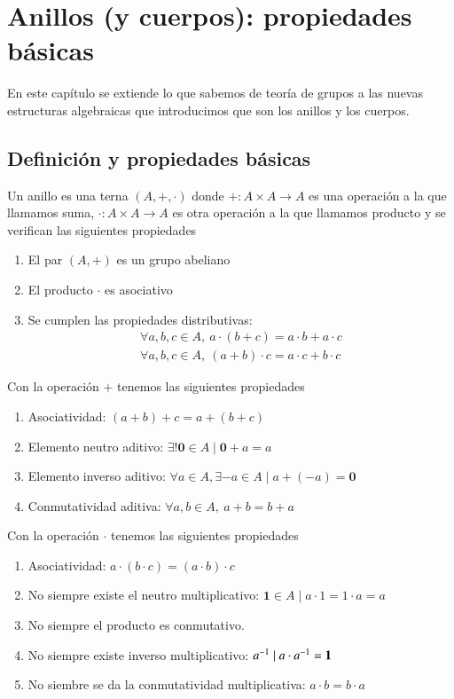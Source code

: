 
\chapter{Anillos (y cuerpos): propiedades básicas}

\newcommand{\0}{\mathbf{0}}
\newcommand{\1}{\mathbf{1}}

En este capítulo se extiende lo que sabemos de teoría de grupos a las nuevas estructuras algebraicas que introducimos que son los anillos y los cuerpos.

\section{Definición y propiedades básicas}

\begin{dfn}[Anillo]
	Un anillo es una terna $(A, +, \cdot)$ donde $+: A \times A \to A$ es una operación a la que llamamos suma, $\cdot: A \times A \to A$ es otra operación a la que llamamos producto y se verifican las siguientes propiedades
	\begin{enumerate}
		\item El par $(A, +)$ es un grupo abeliano
		\item El producto $\cdot$ es asociativo
		\item Se cumplen las propiedades distributivas:
		\begin{align}
			\forall a, b , c \in A,\ a\cdot (b + c) = a\cdot b + a \cdot c \\
			\forall a, b , c \in A,\ (a + b) \cdot c = a\cdot c + b \cdot c
		\end{align}
	\end{enumerate}
\end{dfn}

Con la operación $+$ tenemos las siguientes propiedades
\begin{enumerate}
	\item Asociatividad: $(a+b)+c = a+(b+c)$
	\item Elemento neutro aditivo: $\exists! \0 \in A \mid \0+a = a$
	\item Elemento inverso aditivo: $\forall a \in A, \exists -a \in A \mid a + (-a) = \0$
	\item Conmutatividad aditiva: $\forall a, b \in A,\ a+b = b+a$
\end{enumerate}

Con la operación $\cdot$ tenemos las siguientes propiedades
\begin{enumerate}
	\item Asociatividad: $a\cdot (b \cdot c) = (a \cdot b) \cdot c$
	\item No siempre existe el neutro multiplicativo: $\1 \in A \mid a\cdot 1 = 1 \cdot a = a$
	\item No siempre el producto es conmutativo.
	\item No siempre existe inverso multiplicativo: $\inv{a} \mid a\cdot \inv{a} = \1$
	\item No siembre se da la conmutatividad multiplicativa: $a \cdot b = b\cdot a$
\end{enumerate}

